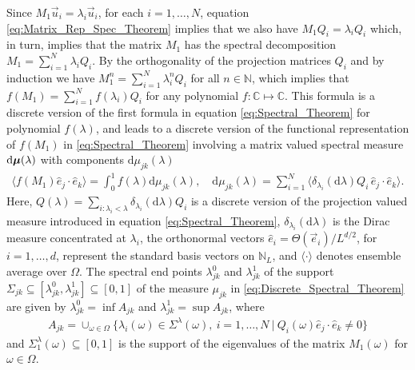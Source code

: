 \documentclass{cmslatex}
\renewcommand{\d}{\text{d}}
\newcommand\bmu{\mbox{\boldmath${\mu}$}}
\begin{document}
Since $M_1\vec{u}_i=\lambda_i\vec{u}_i$, for each $i=1,\ldots,N$, equation
\eqref{eq:Matrix_Rep_Spec_Theorem} implies that we also have
$M_1Q_i=\lambda_iQ_i$ which, in turn, implies that the matrix  $M_1$ has the
spectral decomposition $M_1=\sum_{i=1}^N\lambda_iQ_i$. By the orthogonality of
the projection matrices $Q_i$ and by induction we have
$M_1^n=\sum_{i=1}^N\lambda_i^nQ_i$ for all $n\in\mathbb{N}$, which implies that
$f(M_1)=\sum_{i=1}^Nf(\lambda_i)Q_i$ for any polynomial
$f:\mathbb{C}\mapsto\mathbb{C}$.  This formula is a discrete version of the
first formula in equation \eqref{eq:Spectral_Theorem} for polynomial
$f(\lambda)$, and leads to a discrete version of the functional
representation of  $f(M_1)$ in \eqref{eq:Spectral_Theorem} involving a
matrix valued spectral measure $\d\bmu(\lambda)$ with components $\d\mu_{jk}(\lambda)$
%
\begin{align}\label{eq:Discrete_Spectral_Theorem}
  \langle f(M_1)\hat{e}_j\cdot\hat{e}_k\rangle= \int_0^1f(\lambda)\d\mu_{jk}(\lambda), \quad
  \d\mu_{jk}(\lambda)=\sum_{i=1}^N\langle\delta_{\lambda_i}(\d\lambda)Q_i\,\hat{e}_j\cdot\hat{e}_k\rangle.
\end{align}
%
Here, $Q(\lambda)=\sum_{i:\lambda_i<\lambda}\delta_{\lambda_i}(\d\lambda)Q_i$ is a discrete version of the
projection valued measure introduced in equation
\eqref{eq:Spectral_Theorem}, $\delta_{\lambda_i}(\d\lambda)$ is the Dirac measure
concentrated at $\lambda_i$, the orthonormal vectors
$\hat{e}_i=\Theta(\vec{e}_i)/L^{d/2}$, for $i=1,\ldots,d$, represent the standard
basis vectors on $\mathbb{N}_L$, and $\langle\cdot\rangle$ denotes ensemble
average over $\Omega$. The spectral end points $\lambda_{jk}^0$ and $\lambda_{jk}^1$ of the
support $\Sigma_{jk}\subseteq[\lambda_{jk}^0,\lambda_{jk}^1]\subseteq[0,1]$ of the measure $\mu_{jk}$ in
\eqref{eq:Discrete_Spectral_Theorem} are given by
$\lambda_{jk}^0=\inf A_{jk}$ and $\lambda_{jk}^1=\sup A_{jk}$, where
%
\begin{align}
  A_{jk}= \cup_{\omega\in\Omega}\{\lambda_i(\omega)\in\Sigma^\lambda(\omega), \   i=1,\ldots,N \ | \ Q_i(\omega)\hat{e}_j\cdot\hat{e}_k\neq0\}
\end{align}
%
and $\Sigma^\lambda_1(\omega)\subseteq[0,1]$ is the support of the eigenvalues of the matrix
$M_1(\omega)$ for $\omega\in\Omega$. 
\end{document}
